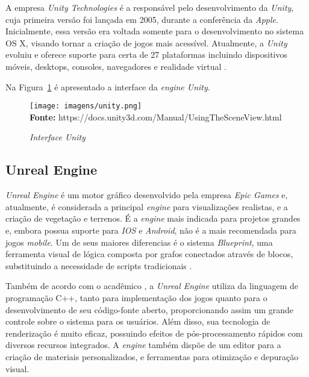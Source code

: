 A empresa \textit{Unity Technologies } é a responsável pelo desenvolvimento da \textit{Unity}, cuja primeira versão foi lançada em 2005, durante a conferência da \textit{Apple}. Inicialmente, essa versão era voltada somente para o desenvolvimento no sistema OS X, visando tornar a criação de jogos mais acessível. Atualmente, a \textit{Unity} evoluiu e oferece suporte para certa de 27 plataformas  incluindo dispositivos móveis, desktops, consoles, navegadores e realidade virtual \cite{Smid2017}.

Na Figura~\ref{fig:unity} é apresentado a interface da \textit{engine Unity}.

\FloatBarrier 
\begin{figure}[!htbp]
	\centering
	\caption{\textit{Interface Unity}}
	\texttt{[image: imagens/unity.png]}
	\\\textbf{Fonte:} https://docs.unity3d.com/Manual/UsingTheSceneView.html 
	\label{fig:unity}
\end{figure}
\FloatBarrier



\subsection{Unreal Engine}

\textit{Unreal Engine} é um motor gráfico desenvolvido pela empresa \textit{Epic Games} e, atualmente, é considerada a principal \textit{engine} para visualizações realistas, e a criação de vegetação e terrenos. É a \textit{engine} mais indicada para projetos grandes e, embora possua suporte para \textit{IOS} e \textit{Android}, não é a mais recomendada para jogos \textit{mobile}. Um de seus maiores diferencias é o sistema \textit{Blueprint}, uma ferramenta visual de lógica composta por grafos conectados através de blocos, substituindo a necessidade de scripts tradicionais \cite{Smid2017}.

Também de acordo com o acadêmico , a \textit{Unreal Engine} utiliza da linguagem de programação C++, tanto para implementação dos jogos quanto para o desenvolvimento de seu código-fonte aberto, proporcionando assim um grande controle sobre o sistema para os usuários. Além disso, sua tecnologia de renderização é muito eficaz, possuindo efeitos de pós-processamento rápidos com diversos recursos integrados. A \textit{engine} também dispõe de um editor para a criação de  materiais personalizados, e ferramentas para otimização e depuração visual.


